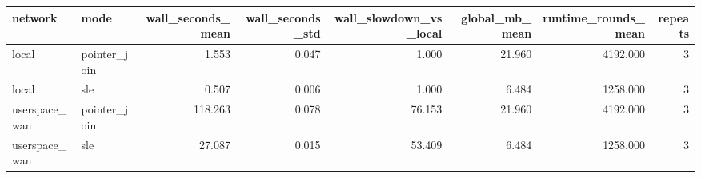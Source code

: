 \begin{tabular}{llrrrrrr}
\toprule
network & mode & wall_seconds_mean & wall_seconds_std & wall_slowdown_vs_local & global_mb_mean & runtime_rounds_mean & repeats \\
\midrule
local & pointer_join & 1.553 & 0.047 & 1.000 & 21.960 & 4192.000 & 3 \\
local & sle & 0.507 & 0.006 & 1.000 & 6.484 & 1258.000 & 3 \\
userspace_wan & pointer_join & 118.263 & 0.078 & 76.153 & 21.960 & 4192.000 & 3 \\
userspace_wan & sle & 27.087 & 0.015 & 53.409 & 6.484 & 1258.000 & 3 \\
\bottomrule
\end{tabular}
